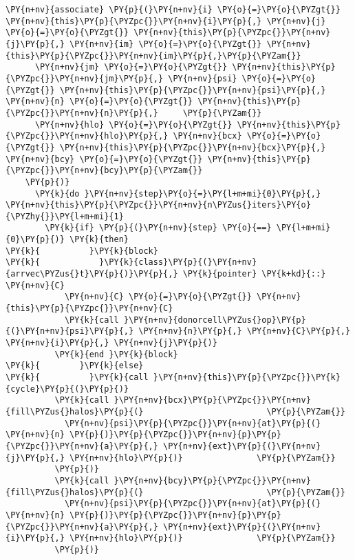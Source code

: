 \begin{Verbatim}[commandchars=\\\{\}]
    \PY{n+nv}{associate} \PY{p}{(}\PY{n+nv}{i} \PY{o}{=}\PY{o}{\PYZgt{}} \PY{n+nv}{this}\PY{p}{\PYZpc{}}\PY{n+nv}{i}\PY{p}{,} \PY{n+nv}{j} \PY{o}{=}\PY{o}{\PYZgt{}} \PY{n+nv}{this}\PY{p}{\PYZpc{}}\PY{n+nv}{j}\PY{p}{,} \PY{n+nv}{im} \PY{o}{=}\PY{o}{\PYZgt{}} \PY{n+nv}{this}\PY{p}{\PYZpc{}}\PY{n+nv}{im}\PY{p}{,}\PY{p}{\PYZam{}}
      \PY{n+nv}{jm} \PY{o}{=}\PY{o}{\PYZgt{}} \PY{n+nv}{this}\PY{p}{\PYZpc{}}\PY{n+nv}{jm}\PY{p}{,} \PY{n+nv}{psi} \PY{o}{=}\PY{o}{\PYZgt{}} \PY{n+nv}{this}\PY{p}{\PYZpc{}}\PY{n+nv}{psi}\PY{p}{,} \PY{n+nv}{n} \PY{o}{=}\PY{o}{\PYZgt{}} \PY{n+nv}{this}\PY{p}{\PYZpc{}}\PY{n+nv}{n}\PY{p}{,}     \PY{p}{\PYZam{}}
      \PY{n+nv}{hlo} \PY{o}{=}\PY{o}{\PYZgt{}} \PY{n+nv}{this}\PY{p}{\PYZpc{}}\PY{n+nv}{hlo}\PY{p}{,} \PY{n+nv}{bcx} \PY{o}{=}\PY{o}{\PYZgt{}} \PY{n+nv}{this}\PY{p}{\PYZpc{}}\PY{n+nv}{bcx}\PY{p}{,} \PY{n+nv}{bcy} \PY{o}{=}\PY{o}{\PYZgt{}} \PY{n+nv}{this}\PY{p}{\PYZpc{}}\PY{n+nv}{bcy}\PY{p}{\PYZam{}}
    \PY{p}{)}
      \PY{k}{do }\PY{n+nv}{step}\PY{o}{=}\PY{l+m+mi}{0}\PY{p}{,} \PY{n+nv}{this}\PY{p}{\PYZpc{}}\PY{n+nv}{n\PYZus{}iters}\PY{o}{\PYZhy{}}\PY{l+m+mi}{1}
        \PY{k}{if} \PY{p}{(}\PY{n+nv}{step} \PY{o}{==} \PY{l+m+mi}{0}\PY{p}{)} \PY{k}{then}
\PY{k}{          }\PY{k}{block}
\PY{k}{            }\PY{k}{class}\PY{p}{(}\PY{n+nv}{arrvec\PYZus{}t}\PY{p}{)}\PY{p}{,} \PY{k}{pointer} \PY{k+kd}{::} \PY{n+nv}{C}
            \PY{n+nv}{C} \PY{o}{=}\PY{o}{\PYZgt{}} \PY{n+nv}{this}\PY{p}{\PYZpc{}}\PY{n+nv}{C}
            \PY{k}{call }\PY{n+nv}{donorcell\PYZus{}op}\PY{p}{(}\PY{n+nv}{psi}\PY{p}{,} \PY{n+nv}{n}\PY{p}{,} \PY{n+nv}{C}\PY{p}{,} \PY{n+nv}{i}\PY{p}{,} \PY{n+nv}{j}\PY{p}{)}
          \PY{k}{end }\PY{k}{block}
\PY{k}{        }\PY{k}{else}
\PY{k}{          }\PY{k}{call }\PY{n+nv}{this}\PY{p}{\PYZpc{}}\PY{k}{cycle}\PY{p}{(}\PY{p}{)}
          \PY{k}{call }\PY{n+nv}{bcx}\PY{p}{\PYZpc{}}\PY{n+nv}{fill\PYZus{}halos}\PY{p}{(}                         \PY{p}{\PYZam{}}
            \PY{n+nv}{psi}\PY{p}{\PYZpc{}}\PY{n+nv}{at}\PY{p}{(} \PY{n+nv}{n} \PY{p}{)}\PY{p}{\PYZpc{}}\PY{n+nv}{p}\PY{p}{\PYZpc{}}\PY{n+nv}{a}\PY{p}{,} \PY{n+nv}{ext}\PY{p}{(}\PY{n+nv}{j}\PY{p}{,} \PY{n+nv}{hlo}\PY{p}{)}               \PY{p}{\PYZam{}}
          \PY{p}{)}
          \PY{k}{call }\PY{n+nv}{bcy}\PY{p}{\PYZpc{}}\PY{n+nv}{fill\PYZus{}halos}\PY{p}{(}                         \PY{p}{\PYZam{}}
            \PY{n+nv}{psi}\PY{p}{\PYZpc{}}\PY{n+nv}{at}\PY{p}{(} \PY{n+nv}{n} \PY{p}{)}\PY{p}{\PYZpc{}}\PY{n+nv}{p}\PY{p}{\PYZpc{}}\PY{n+nv}{a}\PY{p}{,} \PY{n+nv}{ext}\PY{p}{(}\PY{n+nv}{i}\PY{p}{,} \PY{n+nv}{hlo}\PY{p}{)}               \PY{p}{\PYZam{}}
          \PY{p}{)}


\end{Verbatim}
